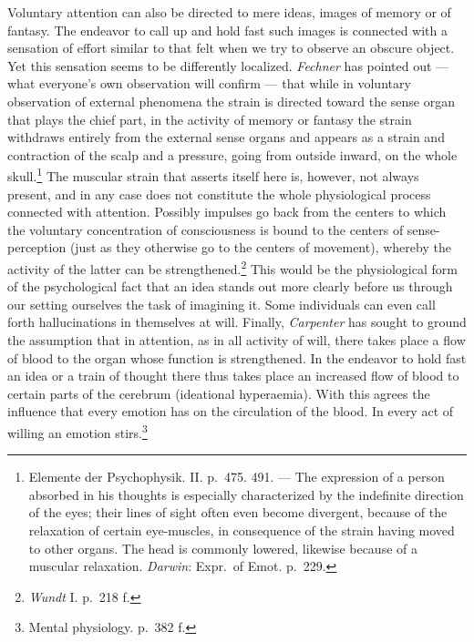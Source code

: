\documentclass[12pt,a4paper]{book}
\newcommand{\opage}[1]{\marginnote{\footnotesize\textit{[#1]}}}
\begin{document}
Voluntary attention can also be directed to mere ideas, images of
memory or of fantasy. The endeavor to call up and hold fast such images is
connected with a sensation of effort similar to that felt when we try to
observe an obscure object. Yet this sensation seems to be differently
localized. \emph{Fechner} has pointed out --- what everyone's own
observation will confirm --- that while in voluntary observation of
external phenomena the strain is directed toward the sense organ that
plays the chief part, in the activity of memory or fantasy the strain
withdraws entirely from the external sense organs and appears as a strain
and contraction of the scalp and a pressure, going from outside inward,
on the whole
skull.\footnote{Elemente der Psychophysik. II. p.~475. 491. --- The
expression of a person absorbed in his thoughts is especially
characterized by the indefinite direction of the eyes; their lines of
sight often even become divergent, because of the relaxation of certain
eye-muscles, in consequence of the strain having moved to other organs.
The head is commonly lowered, likewise because of a muscular relaxation.
\emph{Darwin}: Expr.\ of Emot. p.~229.} The muscular strain that asserts
itself here is, however, not always present, and in any case does not
constitute the whole physiological process connected with attention.
Possibly impulses go back from the centers to which the voluntary
concentration of consciousness is bound to the centers of
sense-perception (just as they otherwise go to the centers of movement),
whereby the
\opage{374}activity of the latter can be strengthened.\footnote{\emph{Wundt}
I. p.~218 f.} This would be the physiological form of the psychological
fact that an idea stands out more clearly before us through our setting
ourselves the task of imagining it. Some individuals can even call forth
hallucinations in themselves at will. Finally, \emph{Carpenter} has
sought to ground the assumption that in attention, as in all activity of
will, there takes place a flow of blood to the organ whose function is
strengthened. In the endeavor to hold fast an idea or a train of thought
there thus takes place an increased flow of blood to certain parts of the
cerebrum (ideational hyperaemia). With this agrees the influence that
every emotion has on the circulation of the blood. In every act of
willing an emotion stirs.\footnote{Mental physiology. p.~382 f.}
\end{document}
